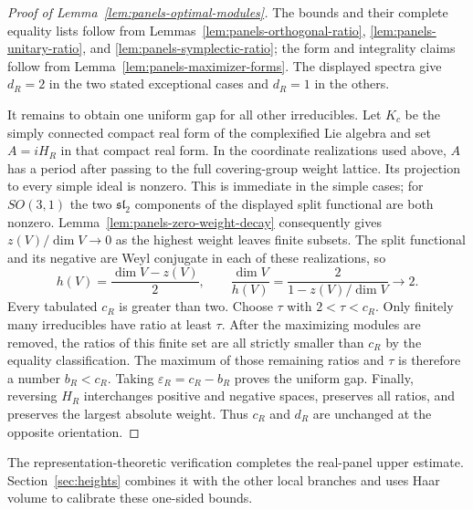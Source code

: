 \begin{proof}[Proof of Lemma~\ref{lem:panels-optimal-modules}]
The bounds and their complete equality lists follow from
Lemmas~\ref{lem:panels-orthogonal-ratio},
\ref{lem:panels-unitary-ratio}, and
\ref{lem:panels-symplectic-ratio}; the form and integrality
claims follow from Lemma~\ref{lem:panels-maximizer-forms}.
The displayed spectra give $d_R=2$ in the two stated
exceptional cases and $d_R=1$ in the others.

It remains to obtain one uniform gap for all other
irreducibles. Let $K_c$ be the simply connected compact
real form of the complexified Lie algebra and set $A=iH_R$
in that compact real form. In the coordinate realizations
used above, $A$ has a period after passing to the full
covering-group weight lattice. Its projection to every
simple ideal is nonzero. This is immediate in the simple
cases; for $SO(3,1)$ the two $\mathfrak{sl}_2$ components
of the displayed split functional are both nonzero.
Lemma~\ref{lem:panels-zero-weight-decay} consequently gives
$z(V)/\dim V\to0$ as the highest weight leaves finite
subsets. The split functional and its negative are Weyl
conjugate in each of these realizations, so
\[
 h(V)=\frac{\dim V-z(V)}2,
 \qquad \frac{\dim V}{h(V)}
       =\frac2{1-z(V)/\dim V}\longrightarrow2.
\]
Every tabulated $c_R$ is greater than two. Choose
$\tau$ with $2<\tau<c_R$. Only finitely many
irreducibles have ratio at least $\tau$. After the
maximizing modules are removed, the ratios of this finite
set are all strictly smaller than $c_R$ by the equality
classification. The maximum of those remaining ratios
and $\tau$ is therefore a number $b_R<c_R$.
Taking $\varepsilon_R=c_R-b_R$ proves the uniform
gap. Finally, reversing $H_R$ interchanges positive and
negative spaces, preserves all ratios, and preserves the
largest absolute weight. Thus $c_R$ and $d_R$ are
unchanged at the opposite orientation.
\end{proof}

The representation-theoretic verification completes the real-panel upper
estimate.  Section~\ref{sec:heights} combines it with the other local
branches and uses Haar volume to calibrate these one-sided bounds.
